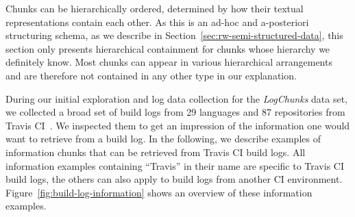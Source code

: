 \documentclass[\myrootdir/main.tex]{subfiles}
\begin{document}
Chunks can be hierarchically ordered, determined by how their textual representations contain each other.
As this is an ad-hoc and a-posteriori structuring schema, as we describe in Section~\ref{sec:rw-semi-structured-data}, this section only presents hierarchical containment for chunks whose hierarchy we definitely know.
Most chunks can appear in various hierarchical arrangements and are therefore not contained in any other type in our explanation.

During our initial exploration and log data collection for the \emph{LogChunks} data set, we collected a broad set of build logs from 29 languages and 87 repositories from Travis CI~\cite{travisci2019webpage}.
We inspected them to get an impression of the information one would want to retrieve from a build log.
In the following, we describe examples of information chunks that can be retrieved from Travis CI build logs.
All information examples containing ``Travis'' in their name are specific to Travis CI build logs, the others can also apply to build logs from another CI environment.
Figure~\ref{fig:build-log-information} shows an overview of these information examples.
\end{document}
